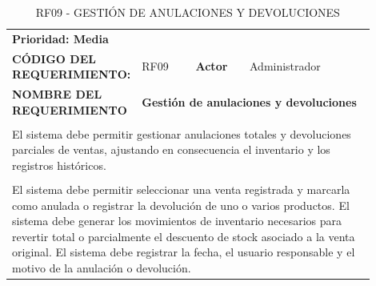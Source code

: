 \begingroup
\renewcommand{\arraystretch}{1.3}
\setlength{\tabcolsep}{6pt}
\centering
\begin{longtable}{|p{0.25\linewidth}|p{0.15\linewidth}|p{0.15\linewidth}|p{0.35\linewidth}|}
\caption{RF09 - GESTIÓN DE ANULACIONES Y DEVOLUCIONES}\label{tab:rf09}\\
\hline
		\rowcolor{tableheaderblue}
		\multicolumn{4}{|l|}{\textbf{Requerimientos funcionales}}                                                                                                                                     \\ \hline
		\multicolumn{4}{|l|}{\textbf{Prioridad: Media}}                                                                                                                                               \\ \hline
		\textbf{CÓDIGO DEL REQUERIMIENTO:}                          & RF09                                                                & \cellcolor{tableheaderblue}\textbf{Actor} & Administrador \\ \hline
		\textbf{NOMBRE DEL REQUERIMIENTO}                           & \multicolumn{3}{l|}{\textbf{Gestión de anulaciones y devoluciones}}                                                             \\ \hline
		\rowcolor{tableheaderblue}
		\multicolumn{4}{|l|}{\textbf{Descripción}}                                                                                                                                                    \\ \hline
		\multicolumn{4}{|p{0.96\linewidth}|}{%
		El sistema debe permitir gestionar anulaciones totales y devoluciones parciales de ventas, ajustando en consecuencia el inventario y los registros históricos.}                               \\ \hline
		\rowcolor{tableheaderblue}
		\multicolumn{4}{|l|}{\textbf{Funcionalidad}}                                                                                                                                                  \\ \hline
		\multicolumn{4}{|p{0.96\linewidth}|}{%
		El sistema debe permitir seleccionar una venta registrada y marcarla como anulada o registrar la devolución de uno o varios productos. \newline
		El sistema debe generar los movimientos de inventario necesarios para revertir total o parcialmente el descuento de stock asociado a la venta original. \newline
		El sistema debe registrar la fecha, el usuario responsable y el motivo de la anulación o devolución.}                                                                                         \\ \hline

\end{longtable}
